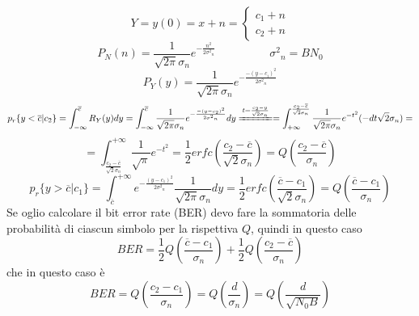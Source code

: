 \documentclass{article}
\begin{document}
\[Y=y(0)=x+n=\begin{cases}
    c_1+n\\
    c_2+n
\end{cases}\]
\[P_N(n)=\frac{1}{\sqrt{2\pi}\sigma_n}e^{-\frac{n^2}{2{\sigma^2}_n}}\hspace{2cm}{\sigma^2}_n=BN_0\]
\[P_Y(y)=\frac{1}{\sqrt{2\pi}\sigma_n}e^{-\frac{-{(y-c_i)}^2}{2{\sigma^2}_n}}\]
\[p_r\{y<\overline{c}|c_2\}=\int_{-\infty}^{\overline{c}}R_Y(y)dy=\int_{-\infty}^{\overline{c}}\frac{1}{\sqrt{2\pi}\sigma_n}e^{-\frac{-{(y-c_2)}^2}{2{\sigma^2}_n}}dy\xlongequal{t=\frac{c_2-y}{\sqrt{2}\sigma_n}}=\int_{+\infty}^{\frac{c_2-\overline{c}}{\sqrt{2}\sigma_n}}\frac{1}{\sqrt{2\pi}\sigma_n}e^{-t^2}(-dt\sqrt{2}\sigma_n)=\]
\[=\int_{\frac{c_2-\overline{c}}{\sqrt{2}\sigma_n}}^{+\infty}\frac{1}{\sqrt{\pi}}e^{-t^2}=\frac{1}{2}erfc\left(\frac{c_2-\overline{c}}{\sqrt{2}\sigma_n}\right)=Q\left(\frac{c_2-\overline{c}}{\sigma_n}\right)\]
\[p_r\{y>\overline{c}|c_1\}=\int_{\overline{c}}^{+\infty}e^{-\frac{{{(y-c_1)}^2}}{2{\sigma^2}_n}}\frac{1}{\sqrt{2\pi}\sigma_n}dy=\frac{1}{2}erfc\left(\frac{\overline{c}-c_1}{\sqrt{2}\sigma_n}\right)=Q\left(\frac{\overline{c}-c_1}{\sigma_n}\right)\]
Se oglio calcolare il bit error rate (BER) devo fare la sommatoria delle probabilità di ciascun simbolo per la rispettiva \(Q\), quindi in questo caso
\[BER=\frac{1}{2}Q\left(\frac{\overline{c}-c_1}{\sigma_n}\right)+\frac{1}{2}Q\left(\frac{c_2-\overline{c}}{\sigma_n}\right)\]
che in questo caso è
\[BER=Q\left(\frac{c_2-c_1}{\sigma_n}\right)=Q\left(\frac{d}{\sigma_n}\right)=Q\left(\frac{d}{\sqrt{N_0 B}}\right)\]
\end{document}
